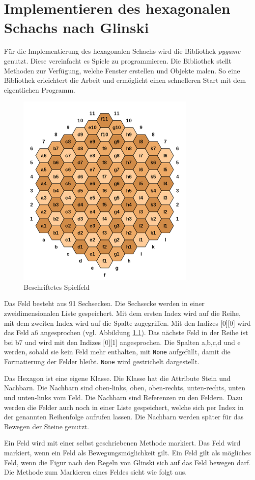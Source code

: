 \chapter{Implementieren des hexagonalen Schachs nach Glinski}
Für die Implementierung des hexagonalen Schachs wird die Bibliothek \textit{pygame} genutzt. Diese vereinfacht es Spiele zu programmieren. Die Bibliothek stellt Methoden zur Verfügung, welche Fenster erstellen und Objekte malen. So eine Bibliothek erleichtert die Arbeit und ermöglicht einen schnelleren Start mit dem eigentlichen Programm.

\begin{figure}[H]
    \centering
    \includegraphics[scale=0.7]{images/hexIndex.png}
    \caption{Beschriftetes Spielfeld \protect\footnotemark}
    \label{fig:hex:index}
\end{figure}

Das Feld besteht aus 91 Sechsecken. Die Sechsecke werden in einer zweidimensionalen Liste gespeichert. Mit dem ersten Index wird auf die Reihe, mit dem zweiten Index wird auf die Spalte zugegriffen. Mit den Indizes [0][0] wird das Feld  a6 angesprochen (vgl. Abbildung \ref{fig:hex:index}). Das nächste Feld in der Reihe ist bei b7 und wird mit den Indizes [0][1] angesprochen. Die Spalten a,b,c,d und e werden, sobald sie kein Feld mehr enthalten, mit \texttt{None} aufgefüllt, damit die Formatierung der Felder bleibt. \texttt{None} wird gestrichelt dargestellt.
\par
Das Hexagon ist eine eigene Klasse. Die Klasse hat die Attribute Stein und Nachbarn. Die Nachbarn sind oben-links, oben, oben-rechts, unten-rechts, unten und unten-links vom Feld. Die Nachbarn sind Referenzen zu den Feldern. Dazu werden die Felder auch noch in einer Liste gespeichert, welche sich per Index in der genannten Reihenfolge aufrufen lassen. Die Nachbarn werden später für das Bewegen der Steine genutzt.\par
Ein Feld wird mit einer selbst geschriebenen Methode markiert. Das Feld wird markiert, wenn ein Feld als Bewegungsmöglichkeit gilt. Ein Feld gilt als mögliches Feld, wenn die Figur nach den Regeln von Glinski sich auf das Feld bewegen darf. Die Methode zum Markieren eines Feldes sieht wie folgt aus.

